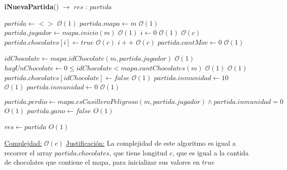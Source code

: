 \documentclass[10pt, a4paper]{article}
\newcommand{\bigO}{\mathcal{O}}
\begin{document}
    \begin{Algoritmos}
        \begin{algorithm}[H]{\textbf{iNuevaPartida}() $\to$ $res$ : $partida$}
            \begin{algorithmic}[1]
                \State $partida \gets <>$                               \Comment $\bigO(1)$
                \State $partida.mapa \gets m$                           \Comment $\bigO(1)$
                \State $partida.jugador \gets mapa.inicio(m)$           \Comment $\bigO(1)$
                \State $i \gets 0$                                      \Comment $\bigO(1)$
                                    \Comment $\bigO(c)$
                    \State $partida.chocolates[i] \gets true$           \Comment $\bigO(c)$
                    \State $i++$                                        \Comment $\bigO(c)$
                \EndWhile
                \State $partida.cantMov \gets 0$                        \Comment $\bigO(1)$

                \State $idChocolate \gets mapa.idChocolate(m, partida.jugador)$             \Comment $\bigO(1)$
                \State $hayUnChocolate \gets 0 \leq idChocolate < mapa.cantChocolates(m)$   \Comment $\bigO(1)$
                                                                       \Comment $\bigO(1)$
                    \State $partida.chocolates[idChocolate] \gets false$                    \Comment $\bigO(1)$
                    \State $partida.inmunidad \gets 10$                                     \Comment $\bigO(1)$
                \Else
                    \State $partida.inmunidad \gets 0$                                      \Comment $\bigO(1)$
                \EndIf

                \State $partida.perdio \gets mapa.esCasilleroPeligroso(m, partida.jugador) \wedge partida.inmunidad = 0$    \Comment $O(1)$
                \State $partida.gano \gets false$                                               \Comment $O(1)$

                \State $res \gets partida$                              \Comment $O(1)$

                \medskip
                \Statex
                \underline{Complejdad:} $\bigO(c)$
                \Statex
                \underline{Justificación:} La complejidad de este algoritmo es igual a recorrer el array $partida.chocolates$, que tiene longitud $c$, que es igual a la cantida de chocolates que contiene el mapa, para inicializar sus valores en $true$
                \end{algorithmic}
        \end{algorithm}


\end{Algoritmos}
\end{document}
